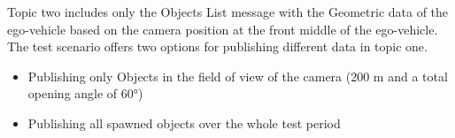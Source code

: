 Topic two includes only the Objects List message with the Geometric data of the ego-vehicle based on the camera position at the front middle of the ego-vehicle.
The test scenario offers two options for publishing different data in topic one.
\begin{itemize}
	\item Publishing only Objects in the field of view of the camera (200 m and a total opening angle of \ang{60})
	\item Publishing all spawned objects over the whole test period
\end{itemize}








